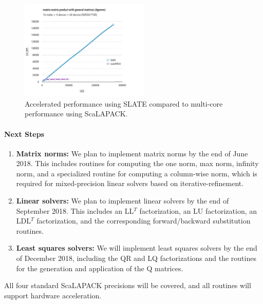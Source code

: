 \begin{figure}[htb]
    \centering
    \includegraphics[width=0.55\textwidth]{projects/2.3.3-MathLibs/2.3.3.09-SLATE/SLATE-dgemm.pdf}
    \caption{\label{fig:slate-dgemm}
    Accelerated performance using SLATE compared to multi-core performance using ScaLAPACK.}
\end{figure}

\paragraph{Next Steps}

\begin{enumerate}
\item
\textbf{Matrix norms:}
We plan to implement matrix norms by the end of June 2018.
This includes routines for computing the one norm, max norm, infinity norm,
and a specialized routine for computing a column-wise norm, which is required
for mixed-precision linear solvers based on iterative-refinement.
\item
\textbf{Linear solvers:}
We plan to implement linear solvers by the end of September 2018.
This includes an LL$^T$ factorization, an LU factorization, an LDL$^T$ factorization,
and the corresponding forward/backward substitution routines.
\item
\textbf{Least squares solvers:}
We will implement least squares solvers by the end of December 2018,
including the QR and LQ factorizations and the routines for the
generation and application of the Q matrices.
\end{enumerate}
All four standard ScaLAPACK precisions will be covered,
and all routines will support hardware acceleration.
